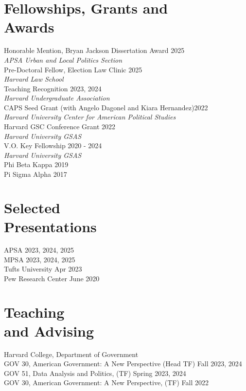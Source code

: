 \documentclass[margin, line]{res}
\begin{document}
\begin{resume}
\section{Fellowships, Grants and \\Awards}


Honorable Mention, Bryan Jackson Dissertation Award \hfill 2025\\
\hspace*{5mm} \textit{APSA Urban and Local Politics Section} \\
Pre-Doctoral Fellow, Election Law Clinic \hfill 2025\\
\hspace*{5mm} \textit{Harvard Law School}\\
Teaching Recognition \hfill 2023, 2024\\
\hspace*{5mm} \textit{Harvard Undergraduate Association}\\
CAPS Seed Grant (with Angelo Dagonel and Kiara Hernandez)\hfill 2022\\
\hspace*{5mm} \textit{Harvard University Center for American Political Studies}\\
Harvard GSC Conference Grant \hfill 2022\\
\hspace*{5mm} \textit{Harvard University GSAS}\\
V.O. Key Fellowship \hfill 2020 - 2024\\
\hspace*{5mm} \textit{Harvard University GSAS}\\
Phi Beta Kappa \hfill 2019\\
Pi Sigma Alpha \hfill 2017

\section{Selected \\Presentations}
APSA \hfill 2023, 2024, 2025\\
MPSA \hfill 2023, 2024, 2025\\
Tufts University \hfill Apr 2023\\
Pew Research Center  \hfill June 2020

\section{Teaching \\and Advising}
Harvard College, Department of Government\\
\hspace*{5mm} GOV 30, American Government: A New Perspective (Head TF) \hfill Fall 2023, 2024\\
\hspace*{5mm} GOV 51, Data Analysis and Politics, (TF) \hfill Spring 2023, 2024\\
\hspace*{5mm} GOV 30, American Government: A New Perspective,  (TF) \hfill Fall 2022


\end{resume}
\end{document}

